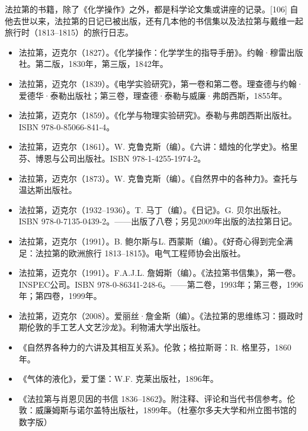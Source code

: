 法拉第的书籍，除了《化学操作》之外，都是科学论文集或讲座的记录。[106] 自他去世以来，法拉第的日记已被出版，还有几本他的书信集以及法拉第与戴维一起旅行时（1813–1815）的旅行日志。
\begin{itemize}
\item 法拉第，迈克尔（1827）。《化学操作：化学学生的指导手册》。约翰·穆雷出版社。第二版，1830年，第三版，1842年。  
\item 法拉第，迈克尔（1839）。《电学实验研究》，第一卷和第二卷。理查德与约翰·爱德华·泰勒出版社；第三卷，理查德·泰勒与威廉·弗朗西斯，1855年。  
\item 法拉第，迈克尔（1859）。《化学与物理实验研究》。泰勒与弗朗西斯出版社。ISBN 978-0-85066-841-4。  
\item 法拉第，迈克尔（1861）。W. 克鲁克斯（编）。《六讲：蜡烛的化学史》。格里芬、博恩与公司出版社。ISBN 978-1-4255-1974-2。  
\item 法拉第，迈克尔（1873）。W. 克鲁克斯（编）。《自然界中的各种力》。查托与温达斯出版社。  
\item 法拉第，迈克尔（1932–1936）。T. 马丁（编）。《日记》。G. 贝尔出版社。ISBN 978-0-7135-0439-2。——出版了八卷；另见2009年出版的法拉第日记。  
\item 法拉第，迈克尔（1991）。B. 鲍尔斯与L. 西蒙斯（编）。《好奇心得到完全满足：法拉第的欧洲旅行 1813–1815》。电气工程师协会出版社。  
\item 法拉第，迈克尔（1991）。F.A.J.L. 詹姆斯（编）。《法拉第书信集》，第一卷。INSPEC公司。ISBN 978-0-86341-248-6。——第二卷，1993年；第三卷，1996年；第四卷，1999年。  
\item 法拉第，迈克尔（2008）。爱丽丝·詹金斯（编）。《法拉第的思维练习：摄政时期伦敦的手工艺人文艺沙龙》。利物浦大学出版社。  
\item 《自然界各种力的六讲及其相互关系》。伦敦；格拉斯哥：R. 格里芬，1860年。  
\item 《气体的液化》，爱丁堡：W.F. 克莱出版社，1896年。  
\item 《法拉第与肖恩贝因的书信 1836–1862》。附注释、评论和当代书信参考。伦敦：威廉姆斯与诺尔盖特出版社，1899年。（杜塞尔多夫大学和州立图书馆的数字版）
\end{itemize}